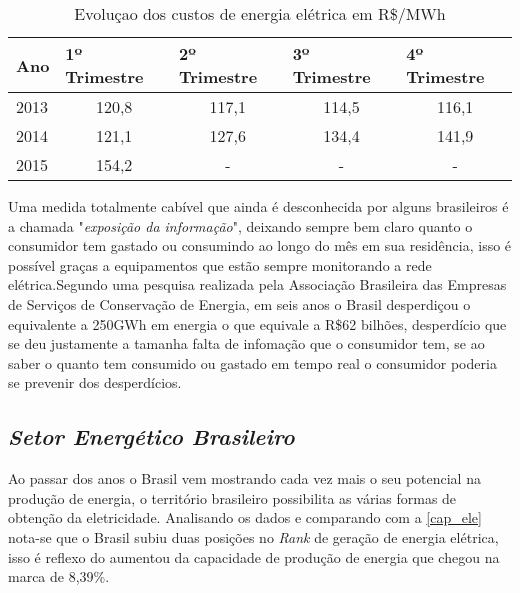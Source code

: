\begin{table}[!ht]
	\centering
	\begin{tabular}{lcccc}
	\hline
	\textbf{Ano} & \multicolumn{1}{l}{\textbf{1º Trimestre}} & \multicolumn{1}{l}{\textbf{2º Trimestre}} & \multicolumn{1}{l}{\textbf{3º Trimestre}} & \multicolumn{1}{l}{\textbf{4º Trimestre}} \\ \hline
	\rowcolor[HTML]{DDDDDD} 
	2013         & 120,8                                     & 117,1                                     & 114,5                                     & 116,1                                     \\
	2014         & 121,1                                     & 127,6                                     & 134,4                                     & 141,9                                     \\
	\rowcolor[HTML]{DDDDDD} 
	2015         & 154,2                                     & -                                         & -                                         & -                                        
	\end{tabular}
	\caption{Evoluçao dos custos de energia elétrica em R\$/MWh}
	\label{evolucao-tarifa}
\end{table}

Uma medida totalmente cabível que ainda é desconhecida por alguns brasileiros é a chamada "\textit{exposição da informação}", deixando sempre bem claro 
quanto o consumidor tem gastado ou consumindo ao longo do mês em sua residência, isso é possível graças a equipamentos que estão sempre monitorando
a rede elétrica.Segundo uma pesquisa realizada pela Associação Brasileira das Empresas de Serviços de Conservação de Energia, em seis anos o Brasil 
desperdiçou o equivalente a 250GWh em energia o que equivale a R\$62 bilhões, desperdício que se deu justamente a tamanha falta de infomação que 
o consumidor tem, se ao saber o quanto tem consumido ou gastado em tempo real o consumidor poderia se prevenir dos desperdícios. 

\subsection[\textit{Setor Energético Brasileiro}]{\textit{Setor Energético Brasileiro}}\label{seb}
Ao passar dos anos o Brasil vem mostrando cada vez mais o seu potencial na produção de energia, o território brasileiro possibilita as várias formas
de obtenção da eletricidade. Analisando os dados \cite[p.29]{epe-anuario-2015} e comparando com a \autoref{cap_ele} nota-se que o Brasil subiu duas
posições no \textit{Rank} de geração de energia elétrica, isso é reflexo do aumentou da capacidade de produção de energia que chegou na marca de 8,39\%.

